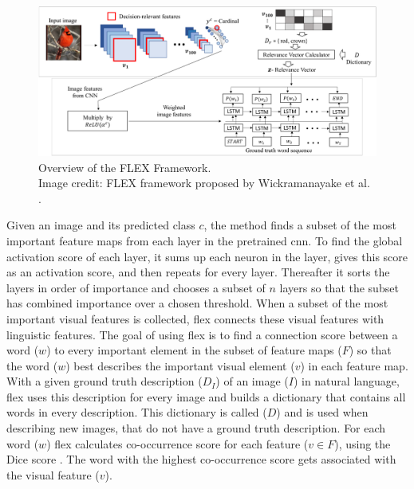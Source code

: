         \begin{figure}[htb]
            \centering
            \centerline{
            \includegraphics[width=17cm]{images/FLEX_overview.png}}
            \caption{Overview of the FLEX Framework.\\
            Image credit: FLEX framework proposed by Wickramanayake et al. \cite{wickramanayakeFLEXFaithfulLinguistic2019}.}
            \label{fig:flex_overview}
        \end{figure}

        Given an image and its predicted class $c$, the method finds a subset of the most important feature maps from each layer in the pretrained \gls{cnn}. To find the global activation score of each layer, it sums up each neuron in the layer, gives this score as an activation score, and then repeats for every layer. Thereafter it sorts the layers in order of importance and chooses a subset of $n$ layers so that the subset has combined importance over a chosen threshold. When a subset of the most important visual features is collected, \gls{flex} connects these visual features with linguistic features. The goal of using \gls{flex} is to find a connection score between a word ($w$) to every important element in the subset of feature maps ($F$) so that the word ($w$) best describes the important visual element ($v$) in each feature map. With a given ground truth description ($D_I$) of an image ($I$) in natural language, \gls{flex} uses this description for every image and builds a dictionary that contains all words in every description. This dictionary is called ($D$) and is used when describing new images, that do not have a ground truth description. For each word ($w$) \gls{flex} calculates co-occurrence score for each feature ($v \in F$), using the Dice score \cite{diceMeasuresAmountEcologic1945, sorensenMethodEstablishingGroups1948}. The word with the highest co-occurrence score gets associated with the visual feature ($v$). 




